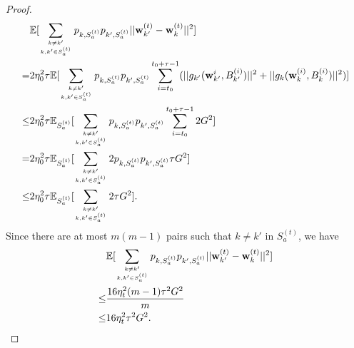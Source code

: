 \documentclass[10pt,journal,compsoc]{IEEEtran}
\newtheorem{proof}{Proof}[section]
\newcommand{\w}{\mathbf{w}}
\newcommand{\s}{S_a^{(t)}}
\begin{document}
\begin{proof}
\begin{equation}
\begin{split}
& \mathbb{E}[\sum_{k\neq k' \atop k,k'\in \s}p_{k,\s}p_{k',\s}||\w_{k'}^{(t)}-\w_k^{(t)}||^2] \\
=& 2\eta_0^2\tau \mathbb{E}[\sum_{k\neq k' \atop k,k'\in \s}p_{k,\s}p_{k',\s}\sum_{i=t_0}^{t_0+\tau-1}(||g_{k'}(\w_{k'}^{i},B_{k'}^{(i)})||^2 + ||g_k(\w_k^{(i)},B_k^{(i)})||^2)]\\
\leq&  2\eta_0^2\tau \mathbb{E}_{\s}[\sum_{k\neq k' \atop k,k'\in \s}p_{k,\s}p_{k',\s}\sum_{i=t_0}^{t_0+\tau-1}2G^2]\\
=& 2\eta_0^2\tau \mathbb{E}_{\s}[\sum_{k\neq k' \atop k,k'\in \s}2p_{k,\s}p_{k',\s}\tau G^2]\\
\leq& 2\eta_0^2\tau \mathbb{E}_{\s}[\sum_{k\neq k' \atop k,k'\in \s}2\tau G^2].
\end{split}
\end{equation}Since there are at most $m(m-1)$ pairs such that $k \neq k'$ in $\s$, we have
\begin{equation}
\begin{split}
& \mathbb{E}[\sum_{k\neq k' \atop k,k'\in \s}p_{k,\s}p_{k',\s}||\w_{k'}^{(t)}-\w_k^{(t)}||^2] \\
\leq& \frac{16\eta_t^2(m-1)\tau^2G^2}{m}\\
\leq& 16\eta_t^2\tau^2G^2.
\end{split}
\end{equation}
\end{proof}
\end{document}
